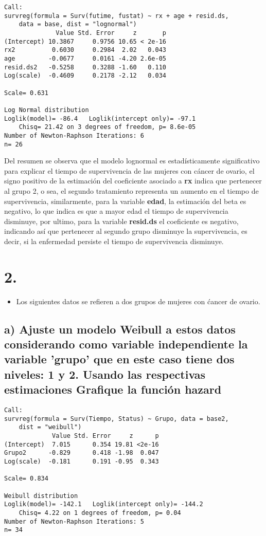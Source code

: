 \documentclass[
]{article}
\providecommand{\tightlist}{%
  \setlength{\itemsep}{0pt}\setlength{\parskip}{0pt}}
\begin{document}
\begin{verbatim}
Call:
survreg(formula = Surv(futime, fustat) ~ rx + age + resid.ds, 
    data = base, dist = "lognormal")
              Value Std. Error     z       p
(Intercept) 10.3867     0.9756 10.65 < 2e-16
rx2          0.6030     0.2984  2.02   0.043
age         -0.0677     0.0161 -4.20 2.6e-05
resid.ds2   -0.5258     0.3288 -1.60   0.110
Log(scale)  -0.4609     0.2178 -2.12   0.034

Scale= 0.631 

Log Normal distribution
Loglik(model)= -86.4   Loglik(intercept only)= -97.1
    Chisq= 21.42 on 3 degrees of freedom, p= 8.6e-05 
Number of Newton-Raphson Iterations: 6 
n= 26 
\end{verbatim}

Del resumen se observa que el modelo lognormal es estadísticamente
significativo para explicar el tiempo de supervivencia de las mujeres
con cáncer de ovario, el signo positivo de la estimación del coeficiente
asociado a \textbf{rx} indica que pertenecer al grupo 2, o sea, el
segundo tratamiento representa un aumento en el tiempo de supervivencia,
similarmente, para la variable \textbf{edad}, la estimación del beta es
negativo, lo que indica es que a mayor edad el tiempo de supervivencia
disminuye, por ultimo, para la variable \textbf{resid.ds} el coeficiente
es negativo, indicando así que pertenecer al segundo grupo disminuye la
supervivencia, es decir, si la enfermedad persiste el tiempo de
supervivencia disminuye.

\section{2.}

\begin{itemize}
\tightlist
\item
  Los siguientes datos se refieren a dos grupos de mujeres con ćancer de
  ovario.
\end{itemize}

\subsection{a) Ajuste un modelo Weibull a estos datos considerando como variable independiente la variable ’grupo’ que en este caso tiene dos niveles: 1 y 2. Usando las respectivas estimaciones Grafique la función hazard}

\begin{verbatim}
Call:
survreg(formula = Surv(Tiempo, Status) ~ Grupo, data = base2, 
    dist = "weibull")
             Value Std. Error     z      p
(Intercept)  7.015      0.354 19.81 <2e-16
Grupo2      -0.829      0.418 -1.98  0.047
Log(scale)  -0.181      0.191 -0.95  0.343

Scale= 0.834 

Weibull distribution
Loglik(model)= -142.1   Loglik(intercept only)= -144.2
    Chisq= 4.22 on 1 degrees of freedom, p= 0.04 
Number of Newton-Raphson Iterations: 5 
n= 34 
\end{verbatim}
\end{document}
